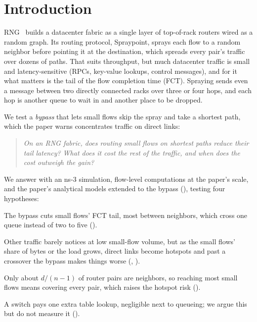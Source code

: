 \section{Introduction}
\label{sec:intro}

RNG~\cite{rng} builds a datacenter fabric as a single layer of top-of-rack routers wired as a random graph. Its routing protocol, Spraypoint, sprays each flow to a random neighbor before pointing it at the destination, which spreads every pair's traffic over dozens of paths. That suits throughput, but much datacenter traffic is small and latency-sensitive (RPCs, key-value lookups, control messages), and for it what matters is the tail of the flow completion time (FCT). Spraying sends even a message between two directly connected racks over three or four hops, and each hop is another queue to wait in and another place to be dropped.

We test a \emph{bypass} that lets small flows skip the spray and take a shortest path, which the paper warns concentrates traffic on direct links:

\begin{quote}
\emph{On an RNG fabric, does routing small flows on shortest paths reduce their tail latency? What does it cost the rest of the traffic, and when does the cost outweigh the gain?}
\end{quote}

We answer with an ns-3 simulation, flow-level computations at the paper's scale, and the paper's analytical models extended to the bypass (), testing four hypotheses:
\begin{description}[leftmargin=2.5em,style=nextline]
  \item[H1 (latency)] The bypass cuts small flows' FCT tail, most between neighbors, which cross one queue instead of two to five ().
  \item[H2 (no free lunch)] Other traffic barely notices at low small-flow volume, but as the small flows' share of bytes or the load grows, direct links become hotspots and past a crossover the bypass makes things worse (, ).
  \item[H3 (reach)] Only about $d/(n-1)$ of router pairs are neighbors, so reaching most small flows means covering every pair, which raises the hotspot risk ().
  \item[H4 (overhead)] A switch pays one extra table lookup, negligible next to queueing; we argue this but do not measure it ().
\end{description}
